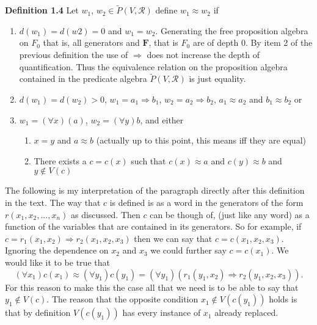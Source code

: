 \documentclass{article}
\theoremstyle{problemstyle}
\begin{document}
\begin{flushleft}
\textbf{Definition 1.4} Let $w_1$, $w_2 \in \widetilde{P}(V,\mathscr{R})$ define $w_1 \approx w_2$ if

\begin{enumerate}
\item $d(w_1) = d(w2) = 0$ and $w_1 = w_2$. Generating the free proposition algebra on $F_0$ that is, all generators and $\textbf{F}$, that is $F_0$ are of depth 0. By item 2 of the previous definition the use of $\Rightarrow$ does not increase the depth of quantification. Thus the equivalence relation on the proposition algebra contained in the predicate algebra $\widetilde{P}(V,\mathscr{R})$ is just equality. 
\item $d(w_1) = d(w_2) > 0$, $w_1 = a_1 \Rightarrow b_1$, $w_2 = a_2 \Rightarrow b_2$, $a_1 \approx a_2$ and $b_1 \approx b_2$ or 
\item $w_1 = (\forall x)(a)$, $w_2 = (\forall y)b$, and either
\begin{enumerate}
\item $x = y$ and $a \approx b$   (actually up to this point, this means iff they are equal)
\item There exists a $c = c(x)$ such that $c(x) \approx a$ and $c(y) \approx b$ and $y \notin V(c)$ 
\end{enumerate}
\end{enumerate}

The following is my interpretation of the paragraph directly after this definition in the text. The way that $c$ is defined is as a word in the generators of the form $r(x_1,x_2,...,x_n)$ as discussed. Then $c$ can be though of, (just like any word) as a function of the variables that are contained in its generators. So for example, if $c = r_1(x_1,x_2)\Rightarrow r_2(x_1,x_2,x_3)$ then we can say that $c = c(x_1,x_2,x_3)$. Ignoring the dependence on $x_2$ and $x_3$ we could further say $c = c(x_1)$. We would like it to be true that $$(\forall x_1)c(x_1) \approx (\forall y_1)c(y_1) = (\forall y_1)(r_1(y_1,x_2)\Rightarrow r_2(y_1,x_2,x_3)).$$ For this reason to make this the case all that we need is to be able to say that $y_1 \notin V(c)$. The reason that the opposite condition $x_1 \notin V(c(y_1))$ holds is that by definition $V(c(y_1))$ has every instance of $x_1$ already replaced. 
\end{flushleft}
\end{document}

